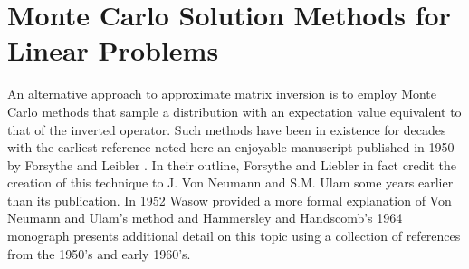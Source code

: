 \chapter{Monte Carlo Solution Methods for Linear Problems}
\label{ch:stochastic_methods}
An alternative approach to approximate matrix inversion is to employ
Monte Carlo methods that sample a distribution with an expectation
value equivalent to that of the inverted operator. Such methods have
been in existence for decades with the earliest reference noted here
an enjoyable manuscript published in 1950 by Forsythe and Leibler
\citep{forsythe_matrix_1950}. In their outline, Forsythe and Liebler
in fact credit the creation of this technique to J. Von Neumann and
S.M. Ulam some years earlier than its publication. In 1952 Wasow
provided a more formal explanation of Von Neumann and Ulam's method
\citep{wasow_note_1952} and Hammersley and Handscomb's 1964 monograph
\citep{hammersley_monte_1964} presents additional detail on this topic
using a collection of references from the 1950's and early 1960's.

